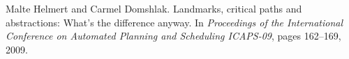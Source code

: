 \begin{thebibliography}{10}
\footnotesize

Malte Helmert and Carmel Domshlak.
\newblock Landmarks, critical paths and abstractions: What’s the difference
anyway.
\newblock In {\em Proceedings of the International Conference on Automated
Planning and Scheduling ICAPS-09}, pages 162--169, 2009.
\end{thebibliography}
